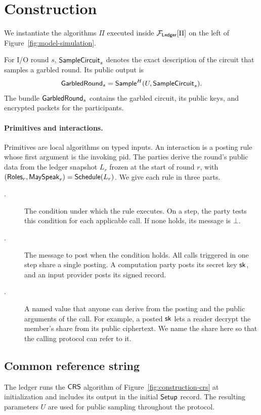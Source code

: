\section{Construction}
\label{sec:construction}

We instantiate the algorithms $\Pi$ executed inside $\mathcal F_{\mathsf{Ledger}}[\Pi]$
on the left of Figure~\ref{fig:model-simulation}.

For I/O round $s$, $\mathsf{SampleCircuit}_s$ denotes the exact description of
the circuit that samples a garbled round.  Its public output is
\[
  \mathsf{GarbledRound}_s=\mathsf{Sample}^H(U,\mathsf{SampleCircuit}_s).
\]
The bundle $\mathsf{GarbledRound}_s$ contains the garbled circuit, its public
keys, and encrypted packets for the participants.

\paragraph{Primitives and interactions.}
Primitives are local algorithms on typed inputs.  An interaction is a
posting rule whose first argument is the invoking pid.  The parties derive the
round's public data from the ledger snapshot $L_r$ frozen at the start
of round $r$, with $(\mathsf{Roles}_r,\mathsf{MaySpeak}_r)=\mathsf{Schedule}(L_r)$.
We give each rule in three parts.
\begin{description}
  \item[\WhenField.] The condition under which the rule executes.  On a step,
    the party tests this condition for each applicable call.  If none
    holds, its message is $\bot$.
  \item[\WhatField.] The message to post when the condition holds.  All calls
    triggered in one step share a single posting.  A computation party
    posts its secret key $\mathsf{sk}$, and an input provider posts its signed record.
  \item[\ValueField.] A named value that anyone can derive from the posting
    and the public arguments of the call.  For example, a posted $\mathsf{sk}$
    lets a reader decrypt the member's share from its public ciphertext.
    We name the share here so that the calling protocol can refer to it.
\end{description}

\subsection{Common reference string}
\label{sec:construction-crs}

The ledger runs the $\mathsf{CRS}$ algorithm of Figure~\ref{fig:construction-crs}
at initialization and includes its output in the initial $\mathsf{Setup}$ record.
The resulting parameters $U$ are used for public sampling throughout
the protocol.


